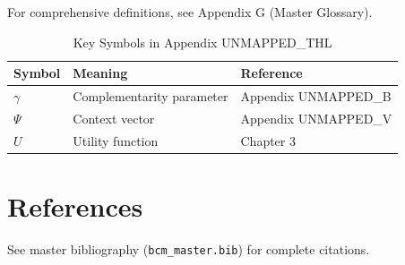 For comprehensive definitions, see Appendix G (Master Glossary).

\begin{table}[htbp]
\centering
\caption{Key Symbols in Appendix UNMAPPED_THL}
\begin{tabular}{lll}
\toprule
\textbf{Symbol} & \textbf{Meaning} & \textbf{Reference} \\
\midrule
$\gamma$ & Complementarity parameter & Appendix UNMAPPED_B \\
$\Psi$ & Context vector & Appendix UNMAPPED_V \\
$U$ & Utility function & Chapter 3 \\
\bottomrule
\end{tabular}
\end{table}


\section{References}
\label{sec:thl-references}

See master bibliography (\texttt{bcm\_master.bib}) for complete citations.

\nocite{bcm_master}

